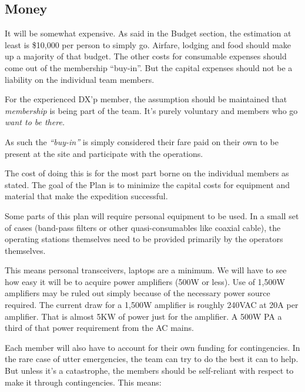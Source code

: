 \documentclass[11pt]{article}
\begin{document}
\subsection{Money}

It will be somewhat expensive.  As said in the
Budget section, the estimation at least is \$10,000
per person to simply go.   Airfare, lodging and food
should make up a majority of that budget.  The other
costs for consumable expenses should come out of the
membership ``buy-in''.  But the capital expenses
should not be a liability on the individual team
members.  
\par
For the experienced DX'p member, the assumption
should be maintained that {\textit{membership}} is
being part of the team.   It's purely voluntary
and members who go {\textit{want to be there.}}
\par
As such the {\textit{``buy-in''}} is simply
considered their fare paid on their own to be
present at the site and participate with the operations.
\par
The cost of doing this is for the most part borne
on the individual members as stated.   The goal
of the Plan is to minimize the capital costs
for equipment and material that make the expedition
successful.
\par
Some parts of this plan will require personal
equipment to be used.   In a small set of cases
(band-pass filters or other quasi-consumables like
coaxial cable), the operating stations themselves need
to be provided primarily by the operators themselves.
\par
This means personal transceivers, laptops are a minimum.
We will have to see how easy it will be to acquire
power amplifiers (500W or less). Use of 1,500W amplifiers
may be ruled out simply because of the necessary power
source required.  The current draw for a 1,500W amplifier
is roughly 240VAC at 20A per amplifier.  That is almost
5KW of power just for the amplifier.   A 500W PA a third
of that power requirement from the AC mains.  
\par
Each member will also have to account for their own
funding for contingencies.   In the rare case of
utter emergencies, the team can try to do the best
it can to help.  But unless it's a catastrophe, the
members should be self-reliant with respect to make
it through contingencies.  This means:
\end{document}
